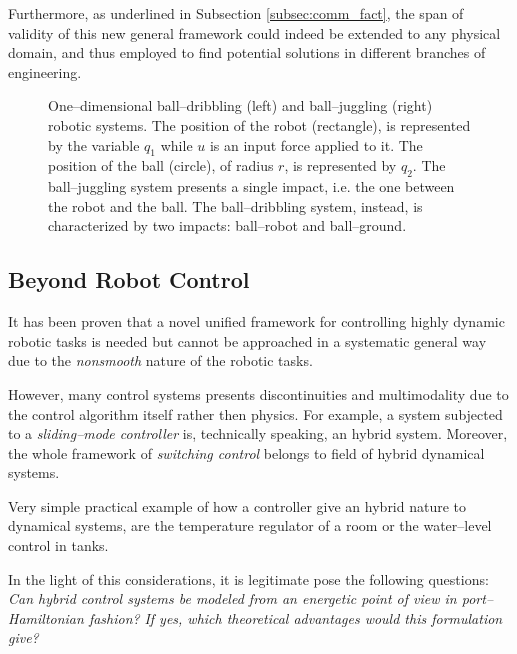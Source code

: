 Furthermore, as underlined in Subsection \ref{subsec:comm_fact}, the span of validity of this new general framework could indeed be extended to any physical domain, and thus employed to find potential solutions in different branches of engineering.
%
\begin{figure}[!h]
	\centering
	
	
	\caption[One--dimensional ball--dribbling and ball--juggling robotic systems.]{One--dimensional ball--dribbling (left) and ball--juggling (right) robotic systems. The position of the robot (rectangle), is represented by the variable $q_1$ while $u$ is an input force applied to it. The position of the ball (circle), of radius $r$, is represented by $q_2$. The ball--juggling system presents a single impact, i.e. the one between the robot and the ball. The ball--dribbling system, instead, is characterized by two impacts: ball--robot and ball--ground.}
	\label{fig:1D}
\end{figure}
%
\subsection{Beyond Robot Control}
It has been proven that a novel unified framework for controlling highly dynamic robotic tasks is needed but cannot be approached in a systematic general way due to the \textit{nonsmooth} nature of the robotic tasks.
%
\newline

%
However, many control systems presents discontinuities and multimodality due to the control algorithm itself rather then physics. 
For example, a system subjected to a \textit{sliding--mode controller} \citep{pisano2011sliding} is, technically speaking, an hybrid system. Moreover, the whole framework of \textit{switching control} belongs to field of hybrid dynamical systems.
%
\newline

%
Very simple practical example of how a controller give an hybrid nature to dynamical systems, are the temperature regulator of a room or the water--level control in tanks.
%
\newline
    
%
In the light of this considerations, it is legitimate pose the following questions: \newline
\textit{Can hybrid control systems be modeled from an energetic point of view in port--Hamiltonian fashion?}\newline
\textit{If yes, which theoretical advantages would this formulation give?}

